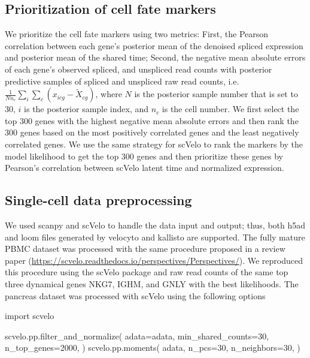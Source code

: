 \documentclass[
  sn-mathphys-num,
  lineno,
  twocolumn]{sn-jnl}
\newenvironment{Shaded}{\begin{snugshade}}{\end{snugshade}}
\newcommand{\DecValTok}[1]{\textcolor[rgb]{0.68,0.00,0.00}{#1}}
\newcommand{\ImportTok}[1]{\textcolor[rgb]{0.00,0.46,0.62}{#1}}
\newcommand{\NormalTok}[1]{\textcolor[rgb]{0.00,0.23,0.31}{#1}}
\newcommand{\OperatorTok}[1]{\textcolor[rgb]{0.37,0.37,0.37}{#1}}
\begin{document}
\subsection{Prioritization of cell fate
markers}\label{sec-methods-fate-markers}

We prioritize the cell fate markers using two metrics: First, the
Pearson correlation between each gene's posterior mean of the denoised
spliced expression and posterior mean of the shared time; Second, the
negative mean absolute errors of each gene's observed spliced, and
unspliced read counts with posterior predictive samples of spliced and
unspliced raw read counts, i.e.
\(\frac{1}{N n_c} \sum_i \sum_c (x_{icg}-\tilde{X}_{cg})\), where \(N\)
is the posterior sample number that is set to \(30\), \(i\) is the
posterior sample index, and \(n_c\) is the cell number. We first select
the top \(300\) genes with the highest negative mean absolute errors and
then rank the \(300\) genes based on the most positively correlated
genes and the least negatively correlated genes. We use the same
strategy for scVelo to rank the markers by the model likelihood to get
the top 300 genes and then prioritize these genes by Pearson's
correlation between scVelo latent time and normalized expression.

\subsection{Single-cell data
preprocessing}\label{sec-methods-preprocessing}

We used scanpy and scVelo to handle the data input and output; thus,
both h5ad and loom files generated by velocyto and kallisto
\citep{Melsted2021-ap} are supported. The fully mature PBMC dataset was
processed with the same procedure proposed in a review paper
\citep{Bergen2021-qz}
(\url{https://scvelo.readthedocs.io/perspectives/Perspectives/}). We
reproduced this procedure using the scVelo package and raw read counts
of the same top three dynamical genes NKG7, IGHM, and GNLY with the best
likelihoods. The pancreas dataset was processed with scVelo using the
following options

\begin{Shaded}
\begin{Highlighting}[]
\ImportTok{import}\NormalTok{ scvelo}

\NormalTok{scvelo.pp.filter\_and\_normalize(}
\NormalTok{  adata}\OperatorTok{=}\NormalTok{adata,}
\NormalTok{  min\_shared\_counts}\OperatorTok{=}\DecValTok{30}\NormalTok{, }
\NormalTok{  n\_top\_genes}\OperatorTok{=}\DecValTok{2000}\NormalTok{,}
\NormalTok{)}
\NormalTok{scvelo.pp.moments(}
\NormalTok{  adata,}
\NormalTok{  n\_pcs}\OperatorTok{=}\DecValTok{30}\NormalTok{,}
\NormalTok{  n\_neighbors}\OperatorTok{=}\DecValTok{30}\NormalTok{,}
\NormalTok{)}
\end{Highlighting}
\end{Shaded}
\end{document}
